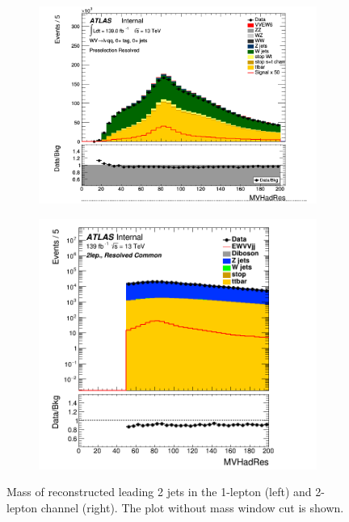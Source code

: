 \begin{figure}[ht]
    \centering
    \begin{subfigure}{0.3\textwidth}
        \includegraphics[width=\linewidth]{figures/1lep/CRPlots/C_0ptag0pjet_0ptv_Presel_Resolved_MVHadRes_Lin.png}
        \caption{\emph{\olep}}
    \end{subfigure}
    \begin{subfigure}{0.3\textwidth}
        \includegraphics[width=\linewidth]{figures/2lep/dataMC/C_0ptag2pjet_0ptv_ResolvedCommon_MVHadRes_Log.png}
        \caption{\emph{\tlep}}
    \end{subfigure}
    \caption{Mass of reconstructed leading 2 jets in the 1-lepton (left) and 2-lepton channel (right). The plot without mass window cut is shown.}
    \label{fig:1lep2lepMVHadResSR}
\end{figure}


